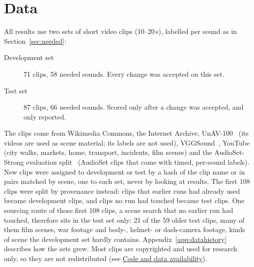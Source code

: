 \section{Data}\label{sec:benchmark}

All results use two sets of short video clips (10--20\,s), labelled per sound as in Section~\ref{sec:needed}:
\begin{description}
  \item[Development set] 71 clips, 58 needed sounds. Every change was accepted on this set.
  \item[Test set] 87 clips, 66 needed sounds. Scored only after a change was accepted, and only reported.
\end{description}
The clips come from Wikimedia Commons, the Internet Archive, UnAV-100~\cite{geng2023unav100} (its videos are used as
scene material; its labels are not used), VGGSound~\cite{chen2020vggsound},
YouTube (city walks, markets, home, transport, incidents, film scenes) and the AudioSet-Strong evaluation split~\cite{hershey2021strong} (AudioSet clips that come with timed, per-sound labels). New
clips were assigned to development or test by a hash of the clip name or in pairs matched by scene, one to each set, never by
looking at results. The first 108 clips were split by provenance instead: clips that earlier runs had already used became development clips, and clips no run had touched became test clips. One sourcing route of those first 108 clips, a scene search that no earlier run had touched, therefore sits in the test set only: 21 of the 59 older test clips, many of them film scenes, war footage and body-, helmet- or dash-camera footage, kinds of scene the development set hardly contains. Appendix~\ref{app:datahistory} describes how the sets grew. Most clips are copyrighted and used for research only, so they are not redistributed
(see \hyperref[sec:availability]{Code and data availability}).

\begin{table}[htbp]
\centering\small
\caption{The two evaluation sets.}
\label{tab:sets}
\end{table}

